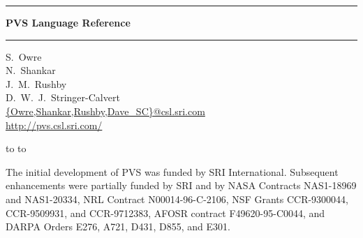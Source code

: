 \documentclass[12pt]{book}
\begin{document}
\begin{titlepage}
\renewcommand{\thepage}{title}
\vspace*{1in}
\noindent
\rule[1pt]{\textwidth}{2pt}
\begin{center}
\textbf{\pvstitle PVS Language Reference}
\end{center}
\rule[1in]{\textwidth}{2pt}
\vspace*{2in}
\begin{flushleft}
S.~Owre\\
N.~Shankar\\
J.~M.~Rushby\\
D.~W.~J.~Stringer-Calvert\\
{\smaller\url{{Owre,Shankar,Rushby,Dave_SC}@csl.sri.com}}\\
{\smaller\url{http://pvs.csl.sri.com/}}
\end{flushleft}
\vspace*{1in}
\vbox{\hbox to %
\hbox to }
\end{titlepage}

\pagestyle{fancy}
\renewcommand{\chaptermark}[1]{\markboth{{\em #1}}{}\markright{{\em #1}}}
\renewcommand{\sectionmark}[1]{\markright{\thesection \em \ #1}}
\lhead[\thepage]{\rightmark}
\cfoot{}
\rhead[\leftmark]{\thepage}
\thispagestyle{empty}

\newpage
\renewcommand{\thepage}{ack}
\vspace*{6in}\noindent
The initial development of PVS was funded by SRI International.
Subsequent enhancements were partially funded by SRI and by NASA
Contracts NAS1-18969 and NAS1-20334, NRL Contract N00014-96-C-2106,
NSF Grants CCR-9300044, CCR-9509931, and CCR-9712383, AFOSR contract
F49620-95-C0044, and DARPA Orders E276, A721, D431, D855, and E301.
\newpage
{}
\setcounter{page}{1}

\tableofcontents

\end{document}
